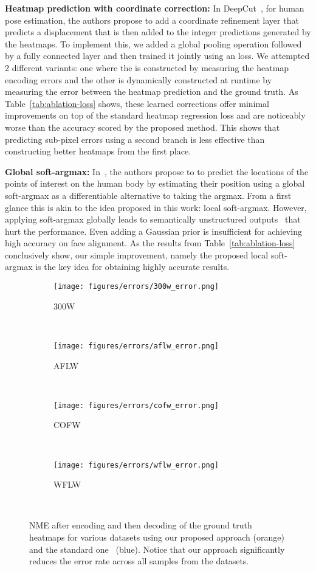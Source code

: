 \documentclass{bmvc2k}
\begin{document}
\noindent\textbf{Heatmap prediction with coordinate correction:} In DeepCut~\cite{pishchulin2016deepcut}, for human pose estimation, the authors propose to add a coordinate refinement layer that predicts a  displacement that is then added to the integer predictions generated by the heatmaps. To implement this, we added a global pooling operation followed by a fully connected layer and then trained it jointly using an  loss. We attempted 2 different variants: one where the  is constructed by measuring the heatmap encoding errors and the other is dynamically constructed at runtime by measuring the error between the heatmap prediction and the ground truth. As Table~\ref{tab:ablation-loss} shows, these learned corrections offer minimal improvements on top of the standard heatmap regression loss and are noticeably worse than the accuracy scored by the proposed method. This shows that predicting sub-pixel errors using a second branch is less effective than constructing better heatmaps from the first place.

\noindent\textbf{Global soft-argmax:} In~\cite{luvizon20182d}, the authors propose to to predict the locations of the points of interest on the human body by estimating their position using a global soft-argmax as a differentiable alternative to taking the argmax. From a first glance this is akin to the idea proposed in this work: local soft-argmax. However, applying soft-argmax globally leads to semantically unstructured outputs~\cite{luvizon20182d} that hurt the performance. Even adding a Gaussian prior is insufficient for achieving high accuracy on face alignment. As the results from Table~\ref{tab:ablation-loss} conclusively show, our simple improvement, namely the proposed local soft-argmax is the key idea for obtaining highly accurate results.  


\begin{figure*}
    \centering
     \begin{subfigure}{0.235\textwidth}
         \texttt{[image: figures/errors/300w\_error.png]}
         \caption{300W}
     \end{subfigure}
     ~
    \begin{subfigure}{0.235\textwidth}
         \texttt{[image: figures/errors/aflw\_error.png]}
         \caption{AFLW}
     \end{subfigure}
     ~
     \begin{subfigure}{0.235\textwidth}
         \texttt{[image: figures/errors/cofw\_error.png]}
         \caption{COFW}
     \end{subfigure}
     ~
    \begin{subfigure}{0.235\textwidth}
         \texttt{[image: figures/errors/wflw\_error.png]}
         \caption{WFLW}
     \end{subfigure}
     ~     
    \caption{NME after encoding and then decoding of the ground truth heatmaps for various datasets using our proposed approach (orange) and the standard one~\cite{bulat2017far} (blue). Notice that our approach significantly reduces the error rate across all samples from the datasets. }
    \label{fig:error_rates}
    \vspace*{-15px}
\end{figure*}
\end{document}
